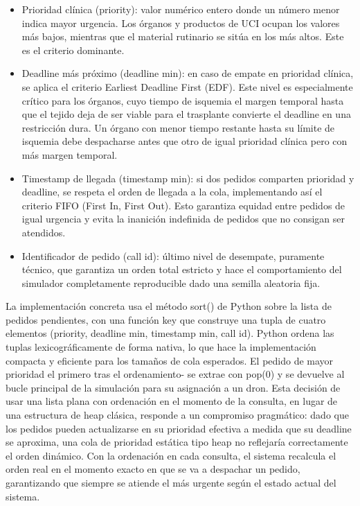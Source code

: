 \documentclass[11pt, a4paper]{article} %
\begin{document}
\begin{itemize}
    \item Prioridad clínica (priority): valor numérico entero donde un número menor indica mayor urgencia. Los órganos y productos de UCI ocupan los valores más bajos, mientras que el material rutinario se sitúa en los más altos. Este es el criterio dominante.
    \item Deadline más próximo (deadline min): en caso de empate en prioridad clínica, se aplica el criterio Earliest Deadline First (EDF). Este nivel es especialmente crítico para los órganos, cuyo tiempo de isquemia el margen temporal hasta que el tejido deja de ser viable para el trasplante convierte el deadline en una restricción dura. Un órgano con menor tiempo restante hasta su límite de isquemia debe despacharse antes que otro de igual prioridad clínica pero con más margen temporal.
    \item Timestamp de llegada (timestamp min): si dos pedidos comparten prioridad y deadline, se respeta el orden de llegada a la cola, implementando así el criterio FIFO (First In, First Out). Esto garantiza equidad entre pedidos de igual urgencia y evita la inanición indefinida de pedidos que no consigan ser atendidos.
    \item Identificador de pedido (call id): último nivel de desempate, puramente técnico, que garantiza un orden total estricto y hace el comportamiento del simulador completamente reproducible dado una semilla aleatoria fija.
\end{itemize}

La implementación concreta usa el método sort() de Python sobre la lista de pedidos pendientes, con una función key que construye una tupla de cuatro elementos (priority, deadline min, timestamp min, call id). Python ordena las tuplas lexicográficamente de forma nativa, lo que hace la implementación compacta y eficiente para los tamaños de cola esperados. El pedido de mayor prioridad el primero tras el ordenamiento- se extrae con pop(0) y se devuelve al bucle principal de la simulación para su asignación a un dron. Esta decisión de usar una lista plana con ordenación en el momento de la consulta, en lugar de una estructura de heap clásica, responde a un compromiso pragmático: dado que los pedidos pueden actualizarse en su prioridad efectiva a medida que su deadline se aproxima, una cola de prioridad estática tipo heap no reflejaría correctamente el orden dinámico. Con la ordenación en cada consulta, el sistema recalcula el orden real en el momento exacto en que se va a despachar un pedido, garantizando que siempre se atiende el más urgente según el estado actual del sistema.
\end{document}
